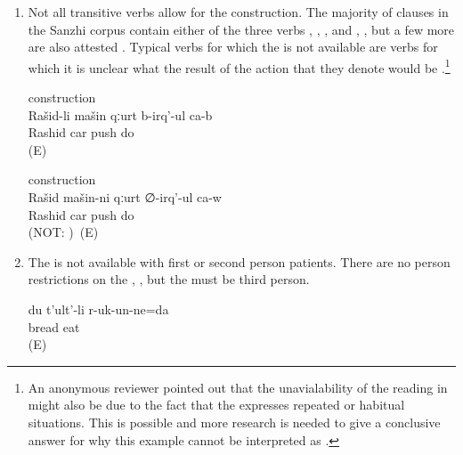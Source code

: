 \begin{enumerate}
	\item	Not all transitive verbs allow for the  construction. The majority of  clauses in the Sanzhi corpus contain either of the three verbs   ,   , , and   , , but a few more are also attested . Typical verbs for which the  is not available are verbs for which it is unclear what the result of the action that they denote would be .\footnote{An anonymous reviewer pointed out that the unavialability of the  reading in  might also be due to the fact that the  expresses repeated or habitual situations. This is possible and more research is needed to give a conclusive answer for why this example cannot be interpreted as .} 
	\begin{exe}
		\ex	\label{ex:Rashid get away from the car@64}
		\begin{xlist}
			\ex	{} construction \label{ex:Rashid is pushing the car@64a} \\
			\gll	Rašid-li	mašin	qːurt	b-irq'-ul ca-b\\
				Rashid	car	push	do \\
			\glt	{} (E)
	
			\ex	{} construction \label{ex:The car is pushing Rashid@64b} \\
			\gll	Rašid	mašin-ni	qːurt	∅-irq'-ul ca-w\\
				Rashid	car	push	do \\
			\glt	{} (NOT: )~(E)
		\end{xlist}
	\end{exe}

	\item	The  is not available with first or second person patients. There are no person restrictions on the  , , but the  must be third person.
	\begin{exe}
		\ex	\label{ex:I (fem.) am eating bread}
		\gll	du	t'ult'-li	r-uk-un-ne=da\\
				bread	eat\tsc{.ipfv-pret-cvb=1}\\
		\glt	\sqt{I (fem.) am eating bread.} (E)
	\end{exe}


\end{enumerate}

